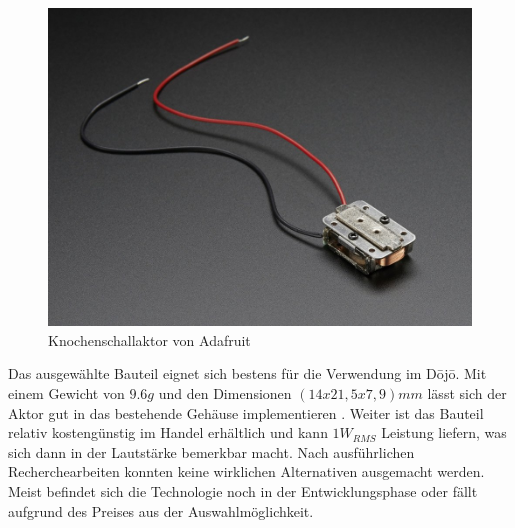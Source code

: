 \begin{figure}[H]
	\begin{center}
		\includegraphics[width=160mm]{data/KnochenschallaktorAdafruit1.jpg}
		\caption[Knochenschallaktor \cite{BoneConductorAdafruit}]{Knochenschallaktor von Adafruit} %
		\label{fig:knochenschallAda}
	\end{center}
\end{figure}

Das ausgewählte Bauteil eignet sich bestens für die Verwendung im Dōjō. Mit einem Gewicht von $9.6 g$ und den Dimensionen $(14x21,5x7,9) mm$ lässt sich der Aktor gut in das bestehende Gehäuse implementieren \cite{BoneConductorAdafruit}. Weiter ist das Bauteil relativ kostengünstig im Handel erhältlich und kann $1W_{RMS}$ Leistung liefern, was sich dann in der Lautstärke bemerkbar macht. Nach ausführlichen Recherchearbeiten konnten keine wirklichen Alternativen ausgemacht werden. Meist befindet sich die Technologie noch in der Entwicklungsphase oder fällt aufgrund des Preises aus der Auswahlmöglichkeit.
